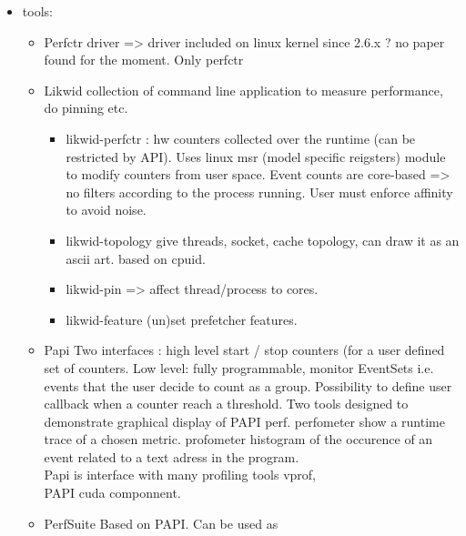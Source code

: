\begin{itemize}
    \item tools:
        \begin{itemize}
            \item Perfctr driver => driver included on linux kernel since 2.6.x ? no
                paper found for the moment. Only perfctr 
            \item Likwid \cite{Treibig10LIKWID} collection of command line application
                to measure performance, do pinning etc.
                \begin{itemize}
                    \item likwid-perfctr : hw counters collected over the runtime (can
                        be restricted by API). Uses linux msr (model specific
                        reigsters) module to modify counters from user space. Event
                        counts are core-based => no filters according to the process
                        running. User must enforce affinity to avoid noise.
                    \item likwid-topology give threads, socket, cache topology, can
                        draw it as an ascii art. based on cpuid.
                    \item likwid-pin => affect thread/process to cores.
                    \item likwid-feature (un)set prefetcher features.
                \end{itemize}
            \item Papi \cite{Browne00Portable,Weaver13PAPI,Malony11Parallel} Two
                interfaces : high level start / stop counters (for a user defined set of
                counters. Low level: fully programmable, monitor EventSets i.e. events
                that the user decide to count as a group. Possibility to define user
                callback when a counter reach a threshold. Two tools designed to
                demonstrate graphical display of PAPI perf. perfometer show a runtime trace
                of a chosen metric. profometer histogram of the occurence of an event
                related to a text adress in the program.
                \\
                Papi is interface with many profiling tools vprof,
                \\
                PAPI cuda componnent.
            \item PerfSuite \cite{Kufrin05Perfsuite} Based on PAPI. Can be used as

\end{itemize}
\end{itemize}
